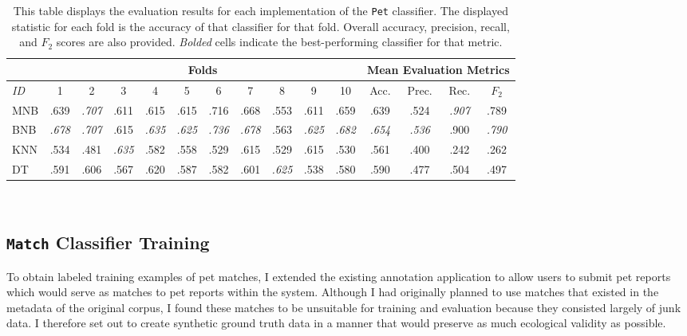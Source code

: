 \begin{table}[htb]
    \caption[{\tt Pet} classifier evaluation]{
	This table displays the evaluation results for each implementation of the {\tt Pet} classifier.  The displayed statistic for each fold is the accuracy of that classifier for that fold.  Overall accuracy, precision, recall, and $F_2$ scores are also provided.  {\em Bolded} cells indicate the best-performing classifier for that metric.
	}
		\small
		\tabcolsep 4.5pt
    \begin{center}
    \begin{tabular}{@{}|l|*{10}{c|}|*{4}{c|}@{}}
    \hline
    & \multicolumn{10}{c||}{Folds} & \multicolumn{4}{|c|}{Mean Evaluation Metrics} \\
		\hline
		{\em ID} & 1 & 2 & 3 & 4 & 5 & 6 & 7 & 8 & 9 & 10 & Acc. & Prec. & Rec. & $F_2$ \\ \hline \hline
		MNB & .639 & {\em .707} & .611 & .615 & .615 & .716 & .668 & .553 & .611 & .659 & .639 & .524 & {\em .907} & .789 \\ \hline
		BNB & {\em .678} & {\em .707} & .615 & {\em .635} & {\em .625} & {\em .736} & {\em .678} & .563 & {\em .625} & {\em .682} & {\em .654} & {\em .536} & .900 & {\em .790} \\ \hline
		KNN & .534 & .481 & {\em .635} & .582 & .558 & .529 & .615 & .529 & .615 & .530 & .561 & .400 & .242 & .262 \\ \hline
		DT & .591 & .606 & .567 & .620 & .587 & .582 & .601 & {\em .625} & .538 & .580 & .590 & .477 & .504 & .497 \\ \hline
		\end{tabular}
   \\ \rule{0mm}{5mm}
	\end{center}
	 \label{table:peteval}
\end{table}

\subsection {{\tt Match} Classifier Training}

To obtain labeled training examples of pet matches, I extended the existing annotation application to allow users to submit pet reports which would serve as matches to pet reports within the system.  Although I had originally planned to use matches that existed in the metadata of the original corpus, I found these matches to be unsuitable for training and evaluation because they consisted largely of junk data.  I therefore set out to create synthetic ground truth data in a manner that would preserve as much ecological validity as possible.

